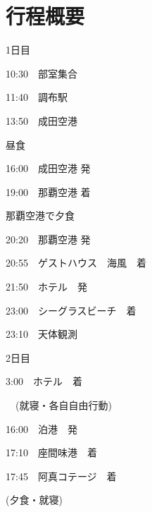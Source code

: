 \documentclass[../main]{subfiles}
\begin{document}
\section{行程概要}
\begin{multicols}{2}
  \small
\begin{description}
    \item 1日目
    \begin{description}
        \item 10:30　部室集合
        \item 11:40　調布駅
        \item 13:50　成田空港
        \item 昼食
        \item 16:00　成田空港 発
        \item 19:00　那覇空港 着
        \item 那覇空港で夕食
        \item 20:20　那覇空港 発
        \item 20:55　ゲストハウス　海風　着
        \item 21:50　ホテル　発
        \item 23:00　シーグラスビーチ　着
        \item 23:10　天体観測
    \end{description}
    \item 2日目
    \begin{description}
        \item  3:00　ホテル　着
        \item　(就寝・各自自由行動)
        \item 16:00　泊港　発
        \item 17:10　座間味港　着
        \item 17:45　阿真コテージ　着
        \item (夕食・就寝)
        \item
        \item
        \item
        \item
    \end{description}
\end{description}
\end{multicols}
\end{document}

